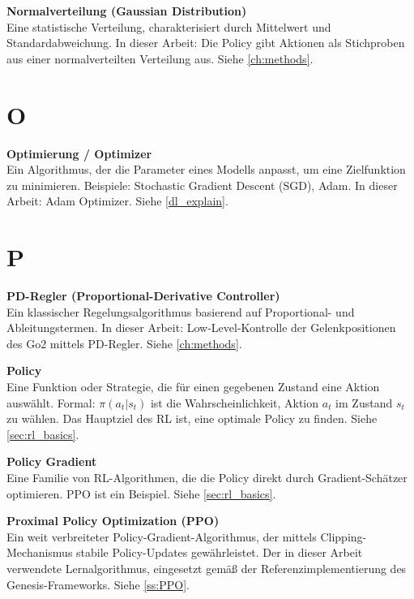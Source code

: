 \vspace{0.5cm}
\noindent\textbf{Normalverteilung (Gaussian Distribution)} \\
Eine statistische Verteilung, charakterisiert durch Mittelwert und Standardabweichung. In dieser Arbeit: Die Policy gibt Aktionen als Stichproben aus einer normalverteilten Verteilung aus. Siehe \autoref{ch:methods}.

\section*{O}

\vspace{0.3cm}
\noindent\textbf{Optimierung / Optimizer} \\
Ein Algorithmus, der die Parameter eines Modells anpasst, um eine Zielfunktion zu minimieren. Beispiele: Stochastic Gradient Descent (SGD), Adam. In dieser Arbeit: Adam Optimizer. Siehe \autoref{dl_explain}.

\section*{P}

\vspace{0.3cm}
\noindent\textbf{PD-Regler (Proportional-Derivative Controller)} \\
Ein klassischer Regelungsalgorithmus basierend auf Proportional- und Ableitungstermen. In dieser Arbeit: Low-Level-Kontrolle der Gelenkpositionen des Go2 mittels PD-Regler. Siehe \autoref{ch:methods}.

\vspace{0.5cm}
\noindent\textbf{Policy} \\
Eine Funktion oder Strategie, die für einen gegebenen Zustand eine Aktion auswählt. Formal: $\pi(a_t | s_t)$ ist die Wahrscheinlichkeit, Aktion $a_t$ im Zustand $s_t$ zu wählen. Das Hauptziel des RL ist, eine optimale Policy zu finden. Siehe \autoref{sec:rl_basics}.

\vspace{0.5cm}
\noindent\textbf{Policy Gradient} \\
Eine Familie von RL-Algorithmen, die die Policy direkt durch Gradient-Schätzer optimieren. PPO ist ein Beispiel. Siehe \autoref{sec:rl_basics}.

\vspace{0.5cm}
\noindent\textbf{Proximal Policy Optimization (PPO)} \\
Ein weit verbreiteter Policy-Gradient-Algorithmus, der mittels Clipping-Mechanismus stabile Policy-Updates gewährleistet. Der in dieser Arbeit verwendete Lernalgorithmus, eingesetzt gemäß der Referenzimplementierung des Genesis-Frameworks. Siehe \autoref{ss:PPO}.

